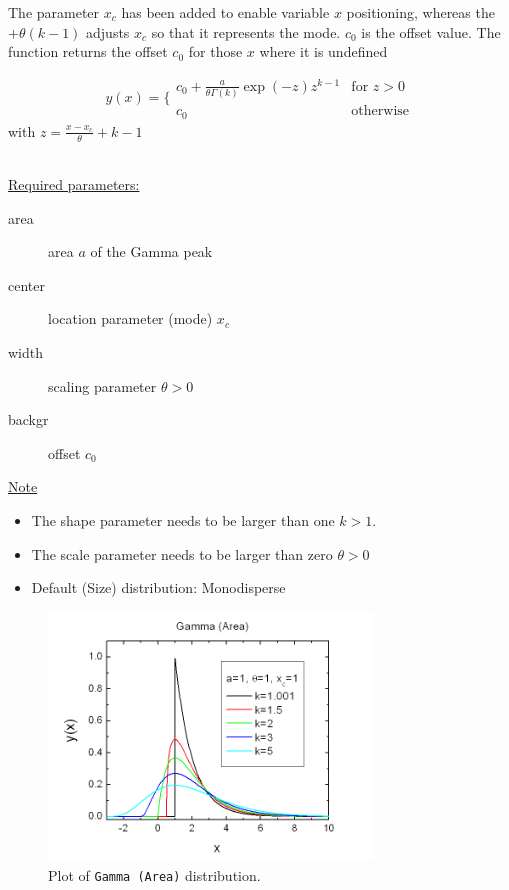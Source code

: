   The parameter $x_c$ has been added to enable variable $x$ positioning,
  whereas the $+\theta(k-1)$ adjusts $x_c$ so that it represents the mode.
  $c_0$ is the offset value.
  The function returns the offset $c_0$ for those $x$ where it is undefined

\begin{equation}
       y(x) = \Bigg\{
       \begin{array}{ll}
           c_0 + \frac{a}{\theta\Gamma(k)} \exp(-z) z^{k-1} & \mbox{for } z > 0 \\
           c_0 &  \mbox{otherwise}
       \end{array}
\end{equation}
with $z=\frac{x-x_c}{\theta} +k-1$

~\\

\uline{Required parameters:}
\begin{description}
    \item[area] area $a$ of the Gamma peak
    \item[center] location parameter (mode) $x_c$
    \item[width] scaling parameter $\theta>0$
    \item[backgr] offset $c_0$
\end{description}

\uline{Note}
\begin{itemize}
  \item The shape parameter needs to be larger than one $k>1$.
  \item The scale parameter needs to be larger than zero $\theta>0$
  \item Default (Size) distribution: Monodisperse
\end{itemize}


\begin{figure}[htb]
\begin{center}
\includegraphics[width=0.768\textwidth]{GammaArea.png}
\end{center}
\caption{Plot of \texttt{Gamma (Area)} distribution.}
\label{fig:GammaArea}
\end{figure}


